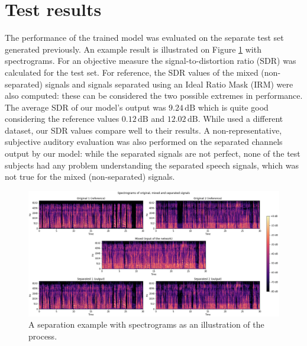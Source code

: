\documentclass{article}
\begin{document}
\section{Test results}
The performance of the trained model was evaluated on the separate test set generated previously. An example result is illustrated on Figure \ref{fig:spectrograms} with spectrograms. For an objective measure the signal-to-distortion ratio (SDR) \cite{Vincent06} was calculated for the test set. For reference, the SDR values of the mixed (non-separated) signals and signals separated using an Ideal Ratio Mask (IRM) \cite{Wang14} were also computed: these can be considered the two possible extremes in performance. The average SDR of our model's output was $9.24\,\mathrm{dB}$ which is quite good considering the reference values $0.12\,\mathrm{dB}$ and $12.02\,\mathrm{dB}$. While \cite{YuKTJ16} used a different dataset, our SDR values compare well to their results. A non-representative, subjective auditory evaluation was also performed on the separated channels output by our model: while the separated signals are not perfect, none of the test subjects had any problem understanding the separated speech signals, which was not true for the mixed (non-separated) signals. 

\begin{figure}
    \centering
    \includegraphics[width=\textwidth]{spectrograms.png}
    \caption{A separation example with spectrograms as an illustration of the process.}
    \label{fig:spectrograms}
\end{figure}
\end{document}
